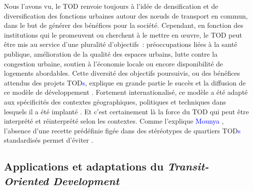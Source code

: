 \begin{refsegment}
Nous l’avons vu, le \acrshort{TOD} renvoie toujours à l'idée de densification et de diversification des fonctions urbaines autour des nœuds de transport en commun, dans le but de générer des bénéfices pour la société. Cependant, en fonction des institutions qui le promeuvent ou cherchent à le mettre en œuvre, le \acrshort{TOD} peut être mis au service d’une pluralité d’objectifs~: préoccupations liées à la santé publique, amélioration de la qualité des espaces urbains, lutte contre la congestion urbaine, soutien à l’économie locale ou encore disponibilité de logements abordables. Cette diversité des objectifs poursuivis, ou des bénéfices attendus des projets \acrshort{TOD}\textcolor{blue}{s}, explique en grande partie le succès et la diffusion de ce modèle de développement \textcolor{blue}{\autocite[14]{bentayou_transit-oriented_2015}}. Fortement internationalisé, ce modèle a été adapté aux spécificités des contextes géographiques, politiques et techniques dans lesquels il a été implanté \textcolor{blue}{\autocites[1~202]{thomas_is_2018}[181]{veloso_e_zarate_quartiers_2024}}. Et c'est certainement là la force du \acrshort{TOD} qui peut être interprété et réinterprété selon les contextes. Comme l’explique \textcolor{blue}{Mounya} \textcolor{blue}{\textcite[52]{el_hadeuf_ville_2017}}, l’absence d’une recette prédéfinie figée dans des stéréotypes de quartiers \acrshort{TOD}\textcolor{blue}{s} standardisés permet d’éviter .%

\subsection{Applications et adaptations du \textsl{Transit-Oriented Development}
    \label{chap1:tod-presentation-generale-declinaisons}
    }


\end{refsegment}
